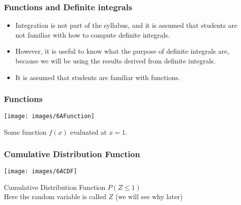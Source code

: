 
\begin{frame}
\frametitle{Functions and Definite integrals}
\begin{itemize}
\item Integration is not part of the syllabus, and it is assumed that students are not familiar with how to compute definite integrals.
\item However,  it is useful to know what the purpose of definite integrals are, because we will be using the results derived from definite integrals. 
\item It is assumed that students are familiar with functions.
\end{itemize}
\end{frame}
\begin{frame}
\frametitle{Functions}

\begin{center}
\texttt{[image: images/6AFunction]}

\end{center}

Some function $f(x)$ evaluated at $x=1$.
\end{frame}

\begin{frame}
\frametitle{Cumulative Distribution Function}
\vspace{-0.5cm}
\begin{center}
\texttt{[image: images/6ACDF]}
\end{center}
Cumulative Distribution Function $P(Z \leq 1)$ \\ Here the random variable is called $Z$ (we will see why later)
\end{frame}

